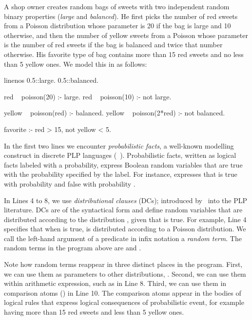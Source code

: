 \begin{example}
    \label{example:sweets_dc}
    A shop owner creates random bags of  sweets with two independent random binary properties (\emph{large} and \emph{balanced}).  He first picks the number of red sweets from a Poisson distribution whose parameter is 20 if the bag is large and 10 otherwise, and then the number of yellow sweets from a Poisson whose parameter is the number of red sweets if the bag is balanced and twice that number otherwise. His favorite type of bag contains more than 15 red sweets and no less than 5 yellow ones. We model this in \dcproblogsty as follows:
\begin{problog*}{linenos}
0.5::large.
0.5::balanced.

red ~ poisson(20) :- large.
red ~ poisson(10) :- not large.

yellow ~ poisson(red) :- balanced.
yellow ~ poisson(2*red) :- not balanced.

favorite :- red > 15, not yellow < 5.
\end{problog*}

In the first two lines we encounter {\em probabilistic facts}, a well-known modelling construct in discrete PLP languages (\eg~\citep{de2007problog}). Probabilistic facts, written as logical facts labeled with a probability, express Boolean random variables that are true with the probability specified by the label. For instance,  expresses that  is true with probability  and false with probability .

In Lines 4 to 8, we use {\em distributional clauses} (DCs); introduced by~\citet{gutmann2011magic} into the PLP literature. DCs are of the syntactical form  and define random variables  that are distributed according to the distribution , given that  is true.
For example, Line 4 specifies that when  is true,  is distributed according to a Poisson distribution. 
We call the left-hand argument of a  predicate in infix notation a {\em random term}. The random terms in the program above are  and .

Note how random terms reappear in three distinct places in the \dcproblogsty program. First, we can use them as parameters to other distributions, \eg {}. 
Second, we can use them within arithmetic expression, such as  in Line 8.
Third, we can use them in comparison atoms () in Line 10. The comparison atoms appear in the bodies of logical rules that express logical consequences of probabilistic event, for example having more than 15 red sweets and less than 5 yellow ones.
\end{example}




